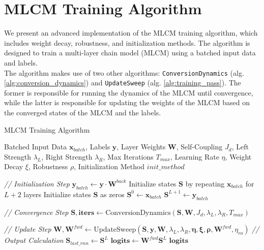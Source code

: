 \documentclass[a4paper,12pt]{report}
\begin{document}
\chapter{MLCM Training Algorithm}
\label{app:mlcm_training_algorithm}
We present an advanced implementation of the MLCM training algorithm, which includes 
weight decay, robustness, and initialization methods. The algorithm is designed to
train a multi-layer chain model (MLCM) using a batched input data and labels. \\
The algorithm makes use of two other algorithms: \texttt{ConversionDynamics} 
(alg. \ref{alg:conversion_dynamics}) and \texttt{UpdateSweep} (alg. \ref{alg:training_pass}).
The former is responsible for running the dynamics of the MLCM until convergence,
while the latter is responsible for updating the weights of the MLCM based on the
converged states of the MLCM and the labels. \\
\begin{algorithm}
\caption{MLCM Training Algorithm}
\label{alg:forward_mlmc}
\begin{algorithmic}[1]
\scriptsize
\Require Batched Input Data  $\mathbf{x}_{batch}$, Labels $\mathbf{y}$, 
Layer Weights $\mathbf{W}$, Self-Coupling $J_d$, Left Strength $\lambda_{L}$, 
Right Strength $\lambda_{R}$, Max Iterations $T_{max}$, Learning Rate $\eta$, 
Weight Decay $\xi$, Robustness $\rho$, Initialization Method $init\_method$

\Statex
\Statex \textit{// Initialization Step}
\State $\mathbf{y}_{batch} \gets \mathbf{y} \cdot \mathbf{W}^{back}$
    \State Initialize states $\mathbf{S}$ by repeating $\mathbf{x}_{batch}$ for $L+2$ layers
    \State Initialize states $\mathbf{S}$ as zeros
\EndIf
\State $\mathbf{S}^0 \gets \mathbf{x}_{batch}$ 
\State $\mathbf{S}^{L+1} \gets \mathbf{y}_{batch}$ 

\Statex
\Statex \textit{// Convergence Step}
\State $\mathbf{S}, \mathbf{iters} \gets \text{ConversionDynamics}(\mathbf{S}, 
\mathbf{W}, J_d, \lambda_{L}, \lambda_{R}, T_{max})$
\label{line:call_conversion_dynamics}

\Statex
{}
    \Statex \textit{// Update Step}
    \label{line:call_update_sweep}
    \State $\mathbf{W}, \mathbf{W}^{fwd} \gets \text{UpdateSweep}(\mathbf{S}, 
    \mathbf{y}, \mathbf{W}, \lambda_{L}, \lambda_{R}, \mathbf{\eta}, \mathbf{\xi}, 
    \mathbf{\rho}, \mathbf{W}^{fwd}, \eta_{ro})$
\Else
    \Statex \textit{// Output Calculation}
    \State $\mathbf{S}_{last\_rnn} \gets \mathbf{S}^L$ 
    \State $\mathbf{logits} \gets \mathbf{W}^{fwd} \mathbf{S}^{L}$
    \State \Return $\mathbf{logits}$
\EndIf
\end{algorithmic}
\end{algorithm}
\end{document}
